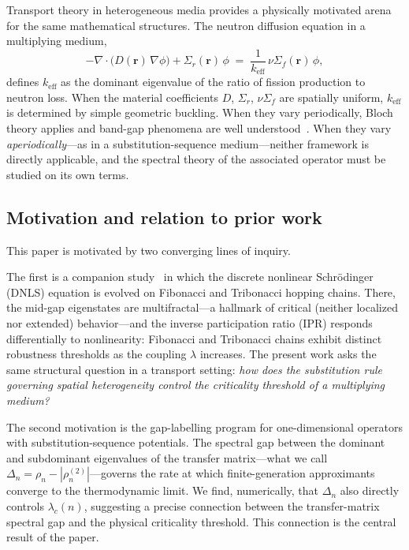 \documentclass[11pt]{article}
\newcommand{\keff}{k_{\mathrm{eff}}}
\newcommand{\lc}{\lambda_c}
\newcommand{\rhon}{\rho_n}
\newcommand{\Sigmar}{\Sigma_r}
\newcommand{\nuSigmaf}{\nu\Sigma_f}
\begin{document}
Transport theory in heterogeneous media provides a physically motivated
arena for the same mathematical structures.
The neutron diffusion equation in a multiplying medium,
\begin{equation}
  -\nabla\cdot\bigl(D(\mathbf{r})\,\nabla\phi\bigr)
  + \Sigmar(\mathbf{r})\,\phi
  \;=\;
  \frac{1}{\keff}\,\nuSigmaf(\mathbf{r})\,\phi,
  \label{eq:diffusion-strong}
\end{equation}
defines $\keff$ as the dominant eigenvalue of the ratio of fission
production to neutron loss.
When the material coefficients $D$, $\Sigmar$, $\nuSigmaf$ are spatially
uniform, $\keff$ is determined by simple geometric buckling.
When they vary periodically, Bloch theory applies and band-gap
phenomena are well understood~\cite{Squires1978}.
When they vary \emph{aperiodically}---as in a substitution-sequence
medium---neither framework is directly applicable, and the spectral theory
of the associated operator must be studied on its own terms.

\subsection{Motivation and relation to prior work}

This paper is motivated by two converging lines of inquiry.

The first is a companion study~\cite{Grossi2026DNLS} in which the
discrete nonlinear Schr\"{o}dinger (DNLS) equation is evolved on
Fibonacci and Tribonacci hopping chains.
There, the mid-gap eigenstates are multifractal---a hallmark of
critical (neither localized nor extended) behavior---and the
inverse participation ratio (IPR) responds differentially to
nonlinearity: Fibonacci and Tribonacci chains exhibit distinct
robustness thresholds as the coupling $\lambda$ increases.
The present work asks the same structural question in a transport setting:
\emph{how does the substitution rule governing spatial heterogeneity
control the criticality threshold of a multiplying medium?}

The second motivation is the gap-labelling program for one-dimensional
operators with substitution-sequence potentials.
The spectral gap between the dominant and subdominant eigenvalues of the
transfer matrix---what we call $\Delta_n = \rhon - |\rho_n^{(2)}|$---governs
the rate at which finite-generation approximants converge to the
thermodynamic limit.
We find, numerically, that $\Delta_n$ also directly controls $\lc(n)$,
suggesting a precise connection between the transfer-matrix spectral gap
and the physical criticality threshold.
This connection is the central result of the paper.
\end{document}
